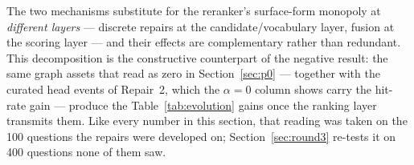The two mechanisms substitute for the reranker's surface-form monopoly
at \emph{different layers} --- discrete repairs at the
candidate/vocabulary layer, fusion at the scoring layer --- and their
effects are complementary rather than redundant. This
decomposition is the constructive counterpart of the negative result:
the same graph assets that read as zero in Section~\ref{sec:p0} ---
together with the curated head events of Repair~2, which the $\alpha=0$
column shows carry the hit-rate gain --- produce the
Table~\ref{tab:evolution} gains once the ranking layer transmits
them. Like every number in this section, that reading was taken on the
100 questions the repairs were developed on; Section~\ref{sec:round3}
re-tests it on 400 questions none of them saw.
